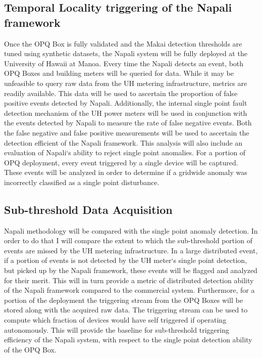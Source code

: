 \subsection{Temporal Locality triggering of the Napali framework} \label{iexp:sec:loc}
Once the OPQ Box is fully validated and the Makai detection thresholds are tuned using synthetic datasets, the Napali system will be fully deployed at the University of Hawaii at Manoa.  Every time the Napali detects an event, both OPQ Boxes and building meters will be queried for data. While it may be unfeasible to query raw data from the UH metering infrastructure, metrics are readily available. This data will be used to ascertain the proportion of false positive events detected by Napali. Additionally, the internal single point fault detection mechanism of the UH power meters will be used in conjunction with the events detected by Napali to measure the rate of false negative events. Both the false negative and false positive measurements will be used to ascertain the detection efficient of the Napali framework. This analysis will also include an evaluation  of Napali`s ability to reject single point anomalies. For a portion of OPQ deployment, every event triggered by a single device will be captured. These events will be analyzed in order to determine if a gridwide anomaly was incorrectly classified as a single point disturbance. 

\subsection{Sub-threshold Data Acquisition} \label{iexp:sec:sub}
Napali methodology will be compared with the single point anomaly detection. In order to do that I will compare the extent to which the sub-threshold portion of events are missed by the UH metering infrastructure. In a large distributed event, if a portion of events is not detected by the UH meter`s single point detection, but picked up by the Napali framework, these events will be flagged and analyzed for their merit. This will in turn provide a metric of distributed detection ability of the Napali framework compared to the commercial system. Furthermore, for a portion of the deployment the triggering stream from the OPQ Boxes will be stored along with the acquired raw data. The triggering stream can be used to compute which fraction of devices would have self triggered if operating autonomously. This will provide the baseline for sub-threshold triggering efficiency of the Napali system, with respect to the single point detection ability of the OPQ Box.


